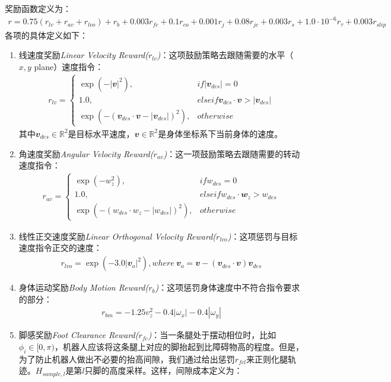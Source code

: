  奖励函数定义为：
  \begin{align}
    r=0.75(r_{lv}+r_{av}+r_{lvo})+r_b+0.003r_{fc}+0.1r_{co}+0.001r_j+0.08r_{jc}+0.003r_s+1.0\cdot 10^{-6}r_{\tau}+0.003r_{slip}
  \end{align}
  各项的具体定义如下：
  \begin{enumerate}
    \item 线速度奖励\emph{Linear Velocity Reward($r_{lv}$)}：这项鼓励策略去跟随需要的水平（$x,y$ plane）速度指令：\begin{align}
      r_{lv}=\begin{cases}
      \exp(-|\mathbfit{v}|^2), & if |\mathbfit{v}_{des}|=0\\
      1.0, & else if \mathbfit{v}_{des}\cdot\mathbfit{v}>|\mathbfit{v}_{des}|\\
      \exp(-(\mathbfit{v}_{des}\cdot\mathbfit{v}-|\mathbfit{v}_{des}|)^2), & otherwise
    \end{cases}
    \end{align}其中$\mathbfit{v}_{des}\in\mathbb{R}^2$是目标水平速度，$\mathbfit{v}\in\mathbb{R}^2$是身体坐标系下当前身体的速度。
    \item 角速度奖励\emph{Angular Velocity Reward($r_{av}$)}：这一项鼓励策略去跟随需要的转动速度指令：\begin{align}
      r_{av}=\begin{cases}
      \exp(-w_z^2), & if w_{des}=0\\
      1.0, & else if w_{des}\cdot\mathbfit{w}_z>w_{des}\\
      \exp(-(w_{des}\cdot w_z-|w_{des}|)^2), & otherwise
    \end{cases}
    \end{align}
    \item 线性正交速度奖励\emph{Linear Orthogonal Velocity Reward($r_{lvo}$)}：这项惩罚与目标速度指令正交的速度：\begin{align}
      r_{lvo}=\exp(-3.0|\mathbfit{v}_o|^2), where\ \mathbfit{v}_o=\mathbfit{v}-(\mathbfit{v}_{des}\cdot\mathbfit{v})\mathbfit{v}_{des}
    \end{align}
    \item 身体运动奖励\emph{Body Motion Reward($r_{b}$)}：这项惩罚身体速度中不符合指令要求的部分：\begin{align}
      r_{bm}=-1.25v_z^2-0.4|\omega_x|-0.4|\omega_y|
    \end{align}
    \item 脚感奖励\emph{Foot Clearance Reward($r_{fc}$)}：当一条腿处于摆动相位时，比如$\phi_i\in[0,\pi)$，机器人应该将这条腿上对应的脚抬起到比障碍物高的程度。但是，为了防止机器人做出不必要的抬高间隙，我们通过给出惩罚$r_{fcl}$来正则化腿轨迹。$H_{sample,l}$是第$l$只脚的高度采样。这样，间隙成本定义为：\begin{align}

\end{align}
\end{enumerate}
